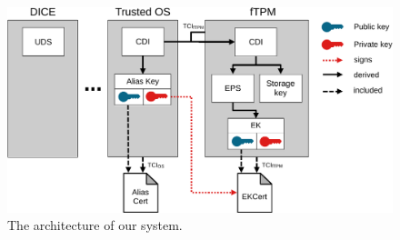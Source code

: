 \begin{figure}[htpb]
  \centering
  \includegraphics[width=1\linewidth]{figures/architecture.pdf}
  \caption{The architecture of our system.} \label{fig:architecture}
\end{figure}
